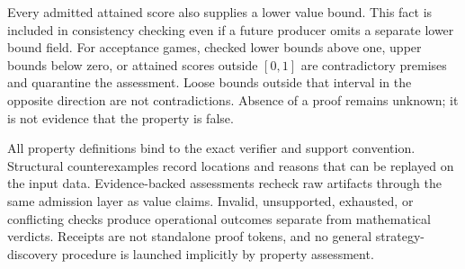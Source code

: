 Every admitted attained score also supplies a lower value bound. This fact is
included in consistency checking even if a future producer omits a separate lower
bound field. For acceptance games, checked lower bounds above one, upper bounds
below zero, or attained scores outside $[0,1]$ are contradictory premises and
quarantine the assessment. Loose bounds outside that interval in the opposite
direction are not contradictions. Absence of a proof remains unknown; it is not
evidence that the property is false.

All property definitions bind to the exact verifier and support convention.
Structural counterexamples record locations and reasons that can be replayed on
the input data. Evidence-backed assessments recheck raw artifacts through the same
admission layer as value claims. Invalid, unsupported, exhausted, or conflicting
checks produce operational outcomes separate from mathematical verdicts. Receipts
are not standalone proof tokens, and no general strategy-discovery procedure is
launched implicitly by property assessment.
